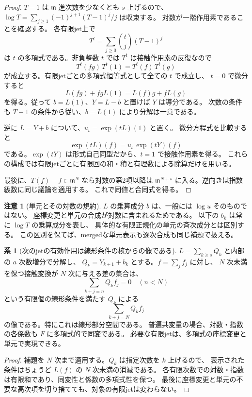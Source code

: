 \documentclass[a4paper,11pt]{ltjsarticle}
\theoremstyle{definition}
\newtheorem{remark}[theorem]{注意}
\newtheorem{corollary}[theorem]{系}
\begin{document}
\begin{proof}
$T-1$ は $\mathfrak m$-進次数を少なくとも $s$ 上げるので、
$\log T=\sum_{j\ge1}(-1)^{j+1}(T-1)^j/j$ は収束する。
対数が一階作用素であることを確認する。
各有限jet上で
\[
 T^t=\sum_{j\ge0}\binom tj(T-1)^j
\]
は $t$ の多項式である。非負整数 $t$ では $T^t$ は接触作用素の反復なので
\[
 T^t(fg)\,T^t(1)=T^t(f)\,T^t(g)
\]
が成立する。有限jetごとの多項式恒等式として全ての $t$ で成立し、
$t=0$ で微分すると
\[
 L(fg)+fgL(1)=L(f)g+fL(g)
\]
を得る。従って $b=L(1)$、$Y=L-b$ と置けば $Y$ は導分である。
次数の条件も $T-1$ の条件から従い、$b=L(1)$ により分解は一意である。

逆に $L=Y+b$ について、$u_t=\exp(tL)(1)$ と置く。
微分方程式を比較すると
\[
 \exp(tL)(f)=u_t\,\exp(tY)(f)
\]
である。$\exp(tY)$ は形式自己同型だから、$t=1$ で接触作用素を得る。
これらの構成では有限jetごとに有限回の和・積と有理数による除算だけを用いる。

最後に、$T(f)-f\in\mathfrak m^N$ なら対数の第2項以降は
$\mathfrak m^{N+s}$ に入る。逆向きは指数級数に同じ議論を適用する。
これで同値と合同式を得る。
\end{proof}

\begin{remark}[単元とその対数の規約]
$L$ の乗算成分 $b$ は、一般には $\log u$ そのものではない。
座標変更と単元の合成が対数に含まれるためである。
以下の $b_k$ は常に $\log T$ の乗算成分を表し、
具体的な有限正規化の単元の斉次成分とは区別する。
この区別を保てば、mergedな単元表示も逐次合成も同じ補題で扱える。
\end{remark}

\begin{corollary}[次のjetの有効作用は線形条件の核からの像である]
\label{cor:v14-filtered-contact-linearization}
$L=\sum_{k\ge s}Q_k$ と内部の $a$ 次数増分で分解し、
$Q_k=Y_{k+1}+b_k$ とする。$f=\sum_j f_j$ に対し、
$N$ 次未満を保つ接触変換が $N$ 次に与える差の集合は、
\[
 \sum_{k+j=n}Q_kf_j=0\quad(n<N)
\]
という有限個の線形条件を満たす $Q_k$ による
\[
 \sum_{k+j=N}Q_kf_j
\]
の像である。特にこれは線形部分空間である。
普遍共変量の場合、対数・指数の各係数も $F$ に多項式的で同変である。
必要な有限jetは、多項式の座標変更と単元で実現できる。
\end{corollary}

\begin{proof}
補題を $N$ 次まで適用する。$Q_k$ は指定次数を $k$ 上げるので、
表示された条件はちょうど $L(f)$ の $N$ 次未満の消滅である。
各有限次数での対数・指数は有限和であり、同変性と係数の多項式性を保つ。
最後に座標変更と単元の不要な高次項を切り捨てても、対象の有限jetは変わらない。
\end{proof}
\end{document}
